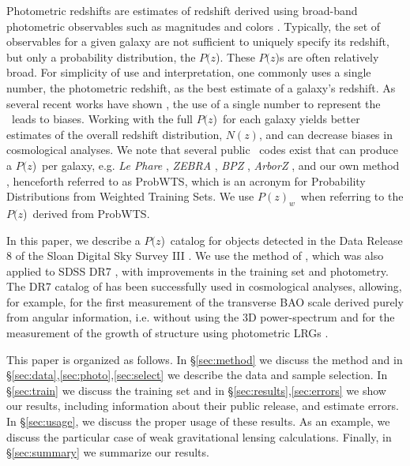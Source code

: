 \documentclass[preprint]{aastex}
\newcommand{\pofz}{$P(z$)}
\newcommand{\pofzw}{$P(z)_w$\ }
\newcommand{\acronym}{ProbWTS}
\begin{document}
Photometric redshifts are estimates of redshift derived using broad-band
photometric observables such as magnitudes and colors \citep{bau62,pus82,koo85,loh86,con95}. 
Typically, the set of observables for a given galaxy are not sufficient to uniquely specify its
redshift, but only a probability distribution, the \pofz.  These \pofz s are
often relatively broad. For simplicity of use and interpretation, one commonly
uses a single number, the photometric redshift, as the best estimate of a
galaxy's redshift.  As several recent works have shown
\citep{man08,CunhaPhotoz09,wit09,bor10,abr11}, the use of a single number to
represent the \photoz\ leads to biases.  Working with the full \pofz\ for each
galaxy yields better estimates of the overall redshift distribution, $N(z)$,
and can decrease biases in cosmological analyses.  We note that several public
\photoz\ codes exist that can produce a \pofz\ per galaxy, e.g.  {\it Le Phare}
\citep{arn99,ilb06}, {\it ZEBRA} \citep{fel06}, {\it BPZ} \citep{coe06}, {\it
ArborZ} \citep{ger10}, and our own method \citep{CunhaPhotoz09}, henceforth
referred to as \acronym, which is an acronym for Probability Distributions from
Weighted Training Sets.  We use \pofzw when referring to the \pofz\  derived from
\acronym.



In this paper, we describe a \pofz\ catalog for objects detected in the Data
Release 8 \citep[SDSS DR8;][]{dr8} of the Sloan Digital Sky Survey III
\citep[SDSS III;][]{Eisenstein2011}.  We use the method of
\citet{CunhaPhotoz09}, which was also applied to SDSS DR7 \citep{dr7}, with
improvements in the training set and photometry.  The DR7 catalog of
\cite{CunhaPhotoz09} has been successfully used in cosmological analyses,
allowing, for example, for the first measurement of the transverse BAO scale
derived purely from angular information, i.e. without using the 3D
power-spectrum \citep{car11}  and for the measurement of the growth of
structure using photometric LRGs \citep{cro11}. 

This paper is organized as follows.  In \S \ref{sec:method} we discuss the
method and in \S \ref{sec:data},\ref{sec:photo},\ref{sec:select} we describe
the data and sample selection. In \S \ref{sec:train} we discuss the training
set and in \S \ref{sec:results},\ref{sec:errors} we show our results, including
information about their public release, and
estimate errors.  In \S \ref{sec:usage}, we discuss the proper usage of these
results. As an example, we discuss the particular case of weak gravitational
lensing calculations.  %
Finally, in \S \ref{sec:summary} we summarize our results.
\end{document}
